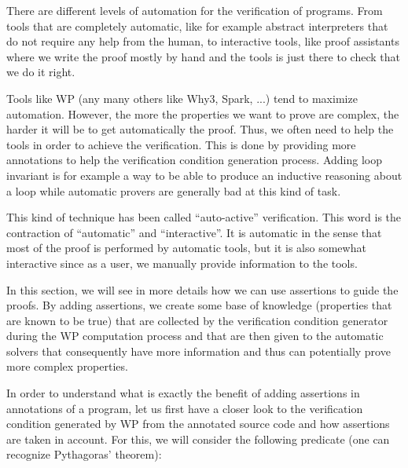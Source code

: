 There are different levels of automation for the verification of programs. From
tools that are completely automatic, like for example abstract interpreters that
do not require any help from the human, to interactive tools, like proof
assistants where we write the proof mostly by hand and the tools is just there
to check that we do it right.



Tools like WP (any many others like Why3, Spark, ...) tend to maximize
automation. However, the more the properties we want to prove are complex, the
harder it will be to get automatically the proof. Thus, we often need to help
the tools in order to achieve the verification. This is done by providing more
annotations to help the verification condition generation process. Adding loop
invariant is for example a way to be able to produce an inductive reasoning
about a loop while automatic provers are generally bad at this kind of task.



This kind of technique has been called ``auto-active'' verification. This word
is the contraction of ``automatic'' and ``interactive''. It is automatic in the
sense that most of the proof is performed by automatic tools, but it is also
somewhat interactive since as a user, we manually provide information to the
tools.



In this section, we will see in more details how we can use assertions to guide
the proofs. By adding assertions, we create some base of knowledge (properties
that are known to be true) that are collected by the verification condition
generator during the WP computation process and that are then given to the
automatic solvers that consequently have more information and thus can
potentially prove more complex properties.






In order to understand what is exactly the benefit of adding assertions in
annotations of a program, let us first have a closer look to the verification
condition generated by WP from the annotated source code and how assertions are
taken in account. For this, we will consider the following predicate (one can
recognize Pythagoras' theorem):






